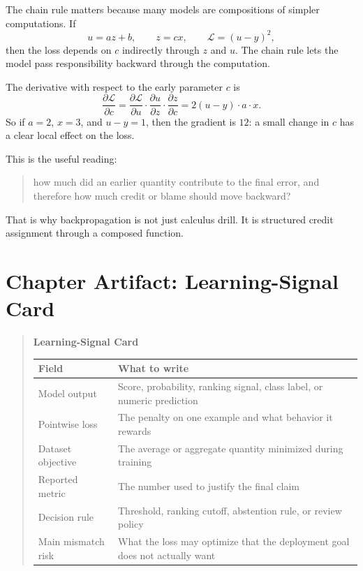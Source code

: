 The chain rule matters because many models are compositions of simpler computations. If
\[
u = a z + b,
\qquad
z = c x,
\qquad
\mathcal{L} = (u-y)^2,
\]
then the loss depends on \(c\) indirectly through \(z\) and \(u\). The chain rule lets the model pass responsibility backward through the computation.

\begin{mathlens}
The derivative with respect to the early parameter \(c\) is
\[
\frac{\partial \mathcal{L}}{\partial c}
=
\frac{\partial \mathcal{L}}{\partial u}
\cdot \frac{\partial u}{\partial z}
\cdot \frac{\partial z}{\partial c}
=
2(u-y)\cdot a \cdot x.
\]
So if \(a=2\), \(x=3\), and \(u-y=1\), then the gradient is \(12\): a small change in \(c\) has a clear local effect on the loss.
\end{mathlens}

This is the useful reading:

\begin{quote}
how much did an earlier quantity contribute to the final error, and therefore how much credit or blame should move backward?
\end{quote}

That is why backpropagation is not just calculus drill. It is structured credit assignment through a composed function.

\section*{Chapter Artifact: Learning-Signal Card}

\begin{quote}
\noindent\textbf{Learning-Signal Card}

\medskip
\begin{tabular}{p{2.6cm}p{5.4cm}}
\toprule
Field & What to write \\
\midrule
Model output & Score, probability, ranking signal, class label, or numeric prediction \\
Pointwise loss & The penalty on one example and what behavior it rewards \\
Dataset objective & The average or aggregate quantity minimized during training \\
Reported metric & The number used to justify the final claim \\
Decision rule & Threshold, ranking cutoff, abstention rule, or review policy \\
Main mismatch risk & What the loss may optimize that the deployment goal does not actually want \\
\bottomrule
\end{tabular}
\end{quote}

